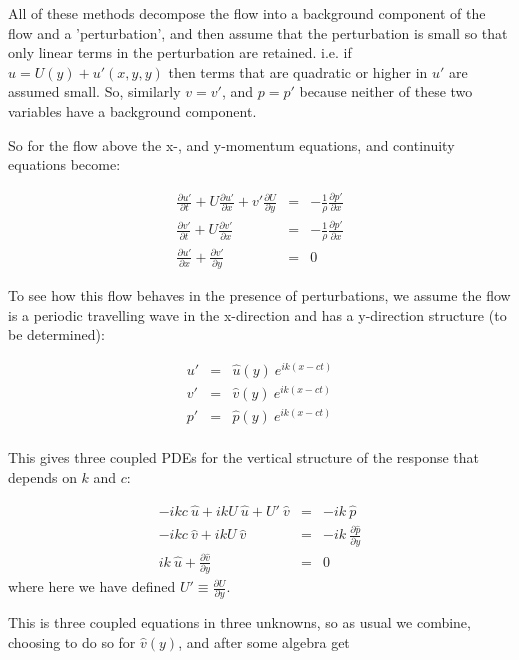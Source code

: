 \documentclass[11pt]{article}
\begin{document}
All of these methods decompose the flow into a background component of the flow and a 'perturbation', and then assume that the perturbation is small so that only linear terms in the perturbation are retained.  i.e. if $u = U(y) + u'(x, y, y)$ then terms that are quadratic or higher in $u'$ are assumed small.   So, similarly $v=v'$, and $p=p'$ because neither of these two variables have a background component. 

So for the flow above the x-, and y-momentum equations, and continuity equations become:

\begin{eqnarray*}
  \frac{\partial u'}{\partial t} + U\frac{\partial u'}{\partial x} + v'\frac{\partial U}{\partial y} & = & - \frac{1}{\rho}\frac{\partial p'}{\partial x} \\
  \frac{\partial v'}{\partial t} + U\frac{\partial v'}{\partial x} & = & - \frac{1}{\rho}\frac{\partial p'}{\partial x}\\
  \frac{\partial u'}{\partial x} + \frac{\partial v'}{\partial y} & = & 0
\end{eqnarray*}

To see how this flow behaves in the presence of perturbations, we assume the flow is a periodic travelling wave in the x-direction and has a y-direction structure (to be determined):

\begin{eqnarray*}
  u' &= &\hat{u}(y)\ e^{i k (x -ct)}\\
  v' &= &\hat{v}(y)\ e^{i k (x -ct)}\\
  p' &= &\hat{p}(y)\ e^{i k (x -ct)}\\
\end{eqnarray*}

This gives three coupled PDEs for the vertical structure of the response that depends on $k$ and $c$:

\begin{eqnarray*}
-ikc\ \hat{u} + ik U\ \hat{u} + U'\ \hat{v} & = & -ik\ \hat{p}\\
-ikc\ \hat{v} + ik U\ \hat{v}  & = & -ik\ \frac{\partial \hat{p}}{\partial y}\\
ik\ \hat{u} + \frac{\partial \hat{v}}{\partial y} & = & 0
\end{eqnarray*}
where here we have defined $U' \equiv \frac{\partial U}{\partial y}$.

This is three coupled equations in three unknowns, so as usual we combine, choosing to do so for $\hat{v}(y)$, and after some algebra get
\end{document}
